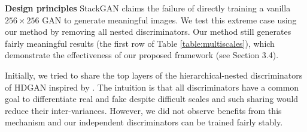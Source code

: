 \documentclass[10pt,twocolumn,letterpaper]{article}
\begin{document}



\textbf{Design principles} StackGAN claims the failure of directly training a vanilla $256{\times}256$ GAN to generate meaningful images. 
We test this extreme case using our method by removing all nested discriminators. Our method still generates fairly meaningful results (the first row of Table \ref{table:multiscales}), which demonstrate the effectiveness of our proposed framework (see Section 3.4).

Initially, we tried to share the top layers of the hierarchical-nested discriminators of HDGAN inspired by \cite{liu2017unsupervised}. The intuition is that all discriminators have a common goal to differentiate real and fake despite difficult scales and such sharing would reduce their inter-variances. 
However, we did not observe benefits from this mechanism and our independent discriminators can be trained fairly stably. 
\end{document}
